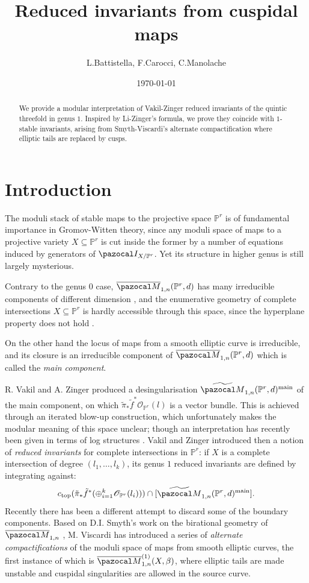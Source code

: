\documentclass[11pt]{amsart}
\title{Reduced invariants from cuspidal maps}
\author{L.Battistella, F.Carocci, C.Manolache}
\date{\today}
\newcommand{\M}[4]{\overline{\pazocal M}_{#1,#2}(#3,#4)}
\newcommand{\PP}{\mathbb P}
\newcommand{\oM}{\overline{\pazocal M}}
\theoremstyle{plain}
\theoremstyle{definition}
\begin{document}
\begin{abstract}

We provide a modular interpretation of Vakil-Zinger reduced invariants of the quintic threefold in genus $1$. Inspired by Li-Zinger's formula, we prove they coincide with $1$-stable invariants, arising from Smyth-Viscardi's alternate compactification where elliptic tails are replaced by cusps.

\end{abstract}

\maketitle
\tableofcontents

\section{Introduction}



The moduli stack of stable maps to the projective space $\PP^r$ is of fundamental importance in Gromov-Witten theory, since any moduli space of maps to a projective variety $X\subseteq \PP^r$ is cut inside the former by a number of equations induced by generators of $\pazocal I_{X/\PP^r}$. Yet its structure in higher genus is still largely mysterious.

Contrary to the genus $0$ case, $\M{1}{n}{\PP^r}{d}$ has many irreducible components of different dimension \cite{Vre}, and the enumerative geometry of complete intersections $X\subseteq \PP^r$ is hardly accessible through this space, since the hyperplane property does not hold \cite{KKP}.

On the other hand the locus of maps from a smooth elliptic curve is irreducible, and its closure is an irreducible component of $\M{1}{n}{\PP^r}{d}$ which is called the \emph{main component}.

R. Vakil and A. Zinger \cite{VZ} produced a desingularisation $\widetilde{\pazocal M}_{1,n}(\PP^r,d)^{\rm{main}}$ of the main component, on which $\tilde\pi_*\tilde f^*\mathcal O_{\PP^r}(l)$ is a vector bundle. This is achieved through an iterated blow-up construction, which unfortunately makes the modular meaning of this space unclear; though an interpretation has recently been given in terms of log structures \cite{RSPW}. Vakil and Zinger introduced then a notion of \emph{reduced invariants} for complete intersections in $\PP^r$: if $X$ is a complete intersection of degree $(l_1,\ldots,l_k)$, its genus $1$ reduced invariants are defined by integrating against:
\[ c_{\rm{top}}(\tilde\pi_*\tilde f^*(\oplus_{i=1}^k\mathcal O_{\PP^r}(l_i)))\cap[\widetilde{\pazocal M}_{1,n}(\PP^r,d)^{\rm{main}}].\]
Recently there has been a different attempt to discard some of the boundary components. Based on D.I. Smyth's work on the birational geometry of $\oM_{1,n}$ \cite{SMY1,SMY2}, M. Viscardi \cite{VISC} has introduced a series of \emph{alternate compactifications} of the moduli space of maps from smooth elliptic curves, the first instance of which is $\oM_{1,n}^{(1)}(X,\beta)$, where elliptic tails are made unstable and cuspidal singularities are allowed in the source curve.
\end{document}
